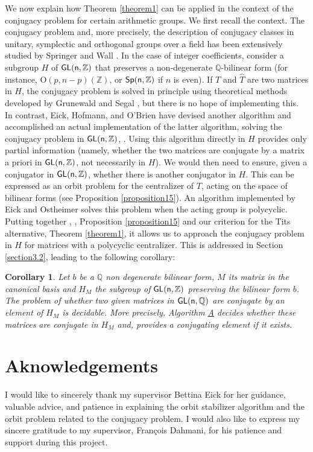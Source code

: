 \documentclass[a4paper,11pt]{article}
\newtheorem{corollary}{Corollary}[section]
\theoremstyle{definition}
\newcommand{\Z}{\mathbb Z}
\newcommand{\Q}{\mathbb Q}
\newcommand{\myref}[1]{\hyperref[#1]{#1}}
\def \GL{\sf{GL}}
\newcommand{\Sp}{\sf{Sp}}
\begin{document}
We now explain how Theorem \ref{theorem1} can be applied in the context of the conjugacy problem for certain arithmetic groups. We first recall the context. The conjugacy problem and, more precisely, the description of conjugacy classes in unitary, symplectic and orthogonal groups over a field has been extensively studied by Springer \cite{springer1951symp} and Wall \cite{wall1963conj}. 
In the case of integer coefficients, consider a subgroup $H$ of $\GL(n,\Z)$  that preserves a non-degenerate $\Q$-bilinear form (for instance, O$(p, n-p)(\Z)$, or $\Sp(n,\Z)$ if $n$ is even). If $T$ and $\widehat{T}$ are two matrices in $H$, the conjugacy problem is solved in principle using theoretical methods developed by Grunewald and Segal \cite{grunewald1980some}, but there is no hope of implementing this. In contrast, Eick, Hofmann, and O'Brien have devised another algorithm and accomplished an actual implementation of the latter algorithm,  solving the conjugacy problem in $\GL(n,\Z)$, \cite{eick2019conjugacy}. Using this algorithm directly in $H$ provides only partial information (namely, whether the two matrices are conjugate by a matrix a priori in $\GL(n,\Z)$, not necessarily in $H$).  We would then need to ensure, given a conjugator in $\GL(n,\Z)$, whether there is another conjugator in $H$. This can be expressed as an orbit problem for the centralizer of $T$, acting on the space of bilinear forms (see Proposition \ref{proposition15}). An algorithm implemented by Eick and Ostheimer \cite{eick2003orbit} solves this problem when the acting group is polycyclic. Putting together \cite{eick2019conjugacy}, \cite{eick2003orbit}, Proposition \ref{proposition15} and our criterion for the Tits alternative, Theorem \ref{theorem1}, it allows us to approach the conjugacy problem in $H$ for matrices with a polycyclic centralizer. This is addressed in Section \ref{section3.2}, leading to the following corollary: 

\begin{corollary}
    Let $b$ be a $\Q$ non degenerate bilinear form, $M$ its matrix in the canonical basis and $H_M$ the subgroup of $\GL(n,\Z)$ preserving the bilinear form $b$.
    The problem of whether two given matrices in $\GL(n,\Q)$ are conjugate by an element of $H_M$ is decidable. More precisely, Algorithm \myref{A} decides whether these matrices are conjugate in $H_M$ and, provides a conjugating element if it exists.
\end{corollary}


\section*{\small Aknowledgements}
I would like to sincerely thank my supervisor Bettina Eick for her guidance, valuable advice, and patience in explaining the orbit stabilizer algorithm and the orbit problem related to the conjugacy problem. I would also like to express my sincere gratitude to my supervisor, François Dahmani, for his patience and support during this project. 
\end{document}
